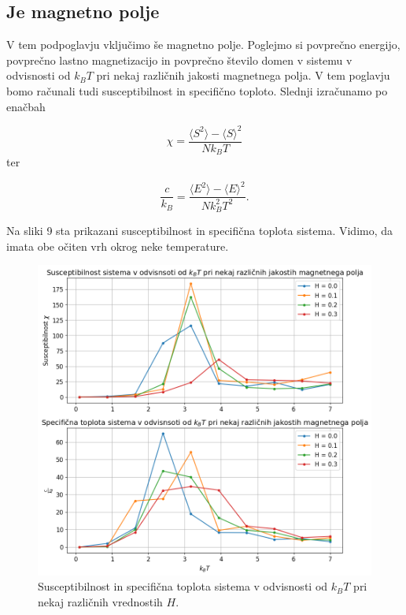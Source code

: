\documentclass[slovene,11pt,a4paper]{article}
\begin{document}
\subsection{Je magnetno polje}

V tem podpoglavju vključimo še magnetno polje. Poglejmo si povprečno energijo, povprečno lastno magnetizacijo in povprečno število domen v sistemu v odvisnosti od $k_BT$ pri nekaj različnih jakosti magnetnega polja. V tem poglavju bomo računali tudi susceptibilnost in specifično toploto. Slednji izračunamo po enačbah

\begin{equation}
\chi = \frac{\langle S^2 \rangle - \langle S \rangle^2}{Nk_BT}
\end{equation}
ter

\begin{equation}
\frac{c}{k_B} = \frac{\langle E^2 \rangle - \langle E \rangle^2}{Nk_B^2T^2}.
\end{equation}

Na sliki 9 sta prikazani susceptibilnost in specifična toplota sistema. Vidimo, da imata obe očiten vrh okrog neke temperature.

\begin{figure}[h!]
\centering
\includegraphics[width=\linewidth]{ising5.png}
\caption{Susceptibilnost in specifična toplota sistema v odvisnosti od $k_BT$ pri nekaj različnih vrednostih $H$.}
\end{figure}
\end{document}
